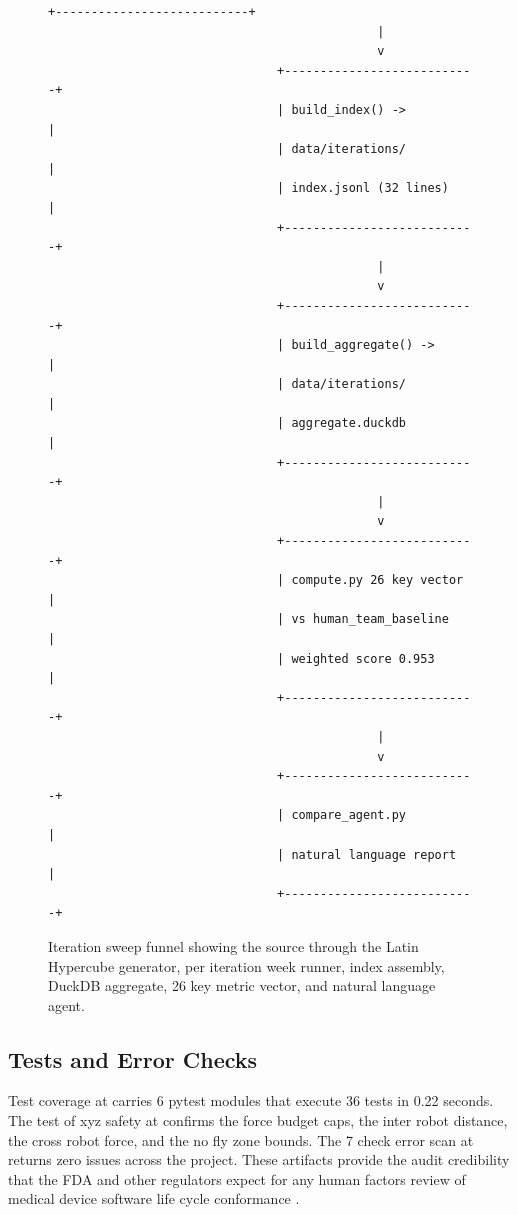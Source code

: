 \begin{sectionaccent}
\begin{figure}[H]
\begin{Verbatim}[fontsize=\footnotesize]
                                +---------------------------+
                                              |
                                              v
                                +---------------------------+
                                | build_index() ->          |
                                | data/iterations/          |
                                | index.jsonl (32 lines)    |
                                +---------------------------+
                                              |
                                              v
                                +---------------------------+
                                | build_aggregate() ->      |
                                | data/iterations/          |
                                | aggregate.duckdb          |
                                +---------------------------+
                                              |
                                              v
                                +---------------------------+
                                | compute.py 26 key vector  |
                                | vs human_team_baseline    |
                                | weighted score 0.953      |
                                +---------------------------+
                                              |
                                              v
                                +---------------------------+
                                | compare_agent.py          |
                                | natural language report   |
                                +---------------------------+
\end{Verbatim}
\vspace{-0.3cm}
\caption{Iteration sweep funnel showing the source through the Latin Hypercube generator, per iteration week runner, index assembly, DuckDB aggregate, 26 key metric vector, and natural language agent.}
\label{fig:iteration-funnel}
\end{figure}

\subsection{Tests and Error Checks}
\label{sec:methods-tests}

Test coverage at  carries 6 pytest modules
that execute 36 tests in 0.22 seconds. The test of xyz safety at
 confirms the force budget caps, the inter
robot distance, the cross robot force, and the no fly zone bounds.
The 7 check error scan at  returns zero issues
across the project. These artifacts provide the audit credibility
that the FDA and other regulators expect for any human factors
review of medical device software life cycle conformance
\cite{iec_62304}.


\end{sectionaccent}
